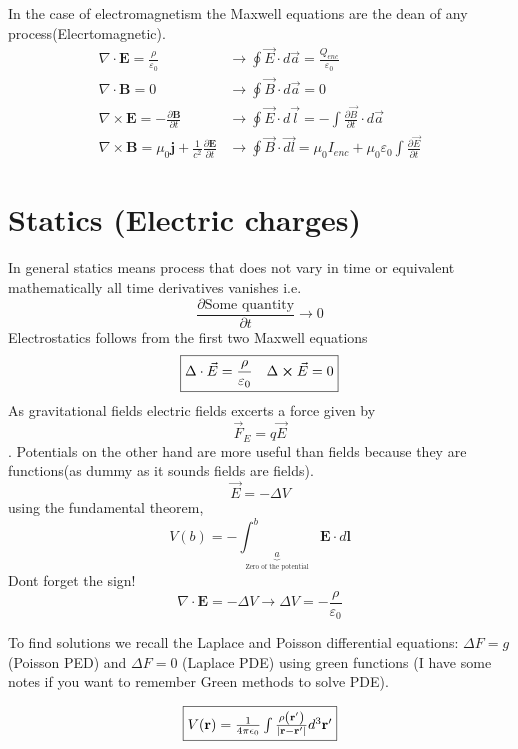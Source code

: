 In the case of electromagnetism the Maxwell equations are the dean of any process(Elecrtomagnetic).
$$\boxed{\begin{aligned}
    \nabla \cdot \mathbf{E} =\frac{\rho}{\varepsilon_{0}}  &\rightarrow  \oint \vec{E} \cdot d \vec{a}=\frac{Q_{e n c}}{\varepsilon_{0}} \\
    \nabla \cdot \mathbf{B} =0  &\rightarrow \oint \vec{B} \cdot d \vec{a}=0 \\
    \nabla \times \mathbf{E} =-\frac{\partial \mathbf{B}}{\partial t}  &\rightarrow  \oint \vec{E} \cdot d \vec{l}=-\int \frac{\partial \vec{B}}{\partial t} \cdot d \vec{a} \\
    \nabla \times \mathbf{B} =\mu_{0} \mathbf{j}+\frac{1}{c^{2}} \frac{\partial \mathbf{E}}{\partial t} &\rightarrow  \oint \vec{B} \cdot \overrightarrow{d l}=\mu_{0} I_{e n c}+\mu_{0} \varepsilon_{0} \int \frac{\partial \vec{E}}{\partial t}
    \end{aligned}}$$
    
\section{Statics (Electric charges)}
In general statics means process that does not vary in time or equivalent mathematically all time derivatives vanishes i.e. $$\frac{\partial \text{Some quantity}}{\partial t} \rightarrow 0$$
Electrostatics follows from the first two Maxwell equations $$\boxed{\Delta \cdot \vec{E}=\frac{\rho}{\varepsilon_0} \quad \Delta \cross \vec{E}=0} $$ 
As gravitational fields electric fields excerts a force given by $$\boxed{\vec{F}_E =q \vec{E}}$$.
Potentials on the other hand are more useful than fields because they are functions(as dummy as it sounds fields are fields).
$$\boxed{\vec{E}=-\Delta V}$$ using the fundamental theorem, $$V(b)=-\int_{\underbrace{a}_{\text{Zero of the potential}}}^{b} \mathbf{E} \cdot d \mathbf{l}$$ Dont forget the sign!
$$\nabla \cdot \mathbf{E} =-{\Delta} V
\rightarrow \Delta V= -\frac{\rho}{\varepsilon_0}$$


To find solutions we recall the Laplace and Poisson differential equations: $\Delta F=g$ (Poisson PED) and $\Delta F= 0$ (Laplace PDE) using green functions (I have some notes if you want to remember Green methods to solve PDE).

$$\boxed{
    $$V(\mathbf{r})=\frac{1}{4 \pi \epsilon_{0}} \int \frac{\rho\left(\mathbf{r}^{\prime}\right)}{\left|\mathbf{r}-\mathbf{r}^{\prime}\right|} d^{3} \mathbf{r}^{\prime}$$ 
}$$

